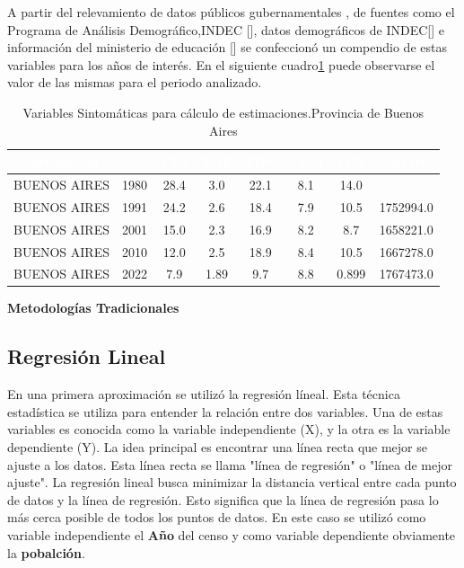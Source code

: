 \documentclass{article}
\theoremstyle{mytheoremstyle}
\theoremstyle{mytheoremstyle}
\theoremstyle{myproblemstyle}
\begin{document}
A partir del relevamiento de datos públicos gubernamentales , de fuentes como el  Programa de Análisis Demográfico,INDEC [],  
datos demográficos de INDEC[] e información del ministerio de educación [] se confeccionó 
un compendio de estas variables para los años de interés.
En el siguiente cuadro\ref{tab:TasasBA} puede observarse el valor de las mismas
para el periodo analizado.\newline
 
\begin{table}[htb] %
  \centering
  \begin{tabular}{|c|c|c|c|c|c|c|c|}
  \hline
  \textbf{\cellcolor[rgb]{0,0.231,0.427}\textcolor{white}{Jurisdiccion}} & \textbf{\cellcolor[rgb]{0,0.231,0.427}\textcolor{white}{$Año$}} & \textbf{\cellcolor[rgb]{0,0.231,0.427}\textcolor{white}{TMI}} & \textbf{\cellcolor[rgb]{0,0.231,0.427}\textcolor{white}{TGF}} & \textbf{\cellcolor[rgb]{0,0.231,0.427}\textcolor{white}{TBN}} & \textbf{\cellcolor[rgb]{0,0.231,0.427}\textcolor{white}{TBM}} & \textbf{\cellcolor[rgb]{0,0.231,0.427}\textcolor{white}{TCV}} & \textbf{\cellcolor[rgb]{0,0.231,0.427}\textcolor{white}{Mat1ria}} \\ \hline
  BUENOS AIRES & 1980 & 28.4 & 3.0 & 22.1 & 8.1 & 14.0 &  \\
  BUENOS AIRES & 1991 & 24.2 & 2.6 & 18.4 & 7.9 & 10.5 & 1752994.0 \\
  BUENOS AIRES & 2001 & 15.0 & 2.3 & 16.9 & 8.2 & 8.7 & 1658221.0 \\
  BUENOS AIRES & 2010 & 12.0 & 2.5 & 18.9 & 8.4 & 10.5 & 1667278.0 \\
  BUENOS AIRES & 2022 & 7.9 & 1.89 & 9.7 & 8.8 & 0.899 & 1767473.0 \\
  \hline
  \end{tabular}
  \caption{Variables Sintomáticas para cálculo de estimaciones.Provincia de Buenos Aires}
  \label{tab:TasasBA}
  \end{table}
  \textbf{Metodologías Tradicionales}
\subsection{Regresión Lineal}
  En una primera aproximación se utilizó la regresión líneal. Esta técnica estadística se utiliza para 
  entender la relación entre dos variables. Una de estas variables es conocida como la variable independiente (X),
   y la otra es la variable dependiente (Y). La idea principal es encontrar una línea recta que mejor se ajuste a los datos. 
  Esta línea recta se llama "línea de regresión" o "línea de mejor ajuste".
  La regresión lineal busca minimizar la distancia vertical entre cada punto de datos y 
  la línea de regresión. Esto significa que la línea de regresión pasa lo más cerca posible de todos los puntos de datos. \newline
  En este caso se utilizó como variable independiente el \textbf{Año} del censo y como variable dependiente obviamente la \textbf{pobalción}.
\end{document}
